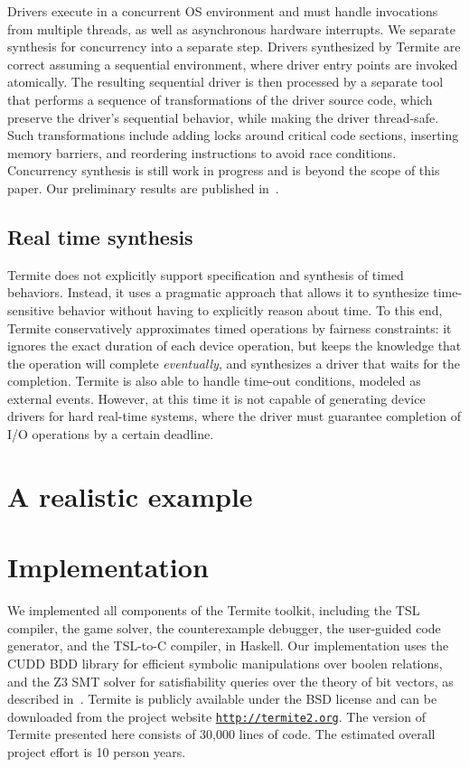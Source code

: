 \documentclass[a4paper,twoside,openright,11pt]{book}
\newcommand{\termite}{Termite\xspace}
\theoremstyle{definition}
\begin{document}
Drivers execute in a concurrent OS environment and must handle invocations from multiple threads, as well as asynchronous hardware interrupts.  We separate synthesis for concurrency into a separate step.  Drivers synthesized by \termite are correct assuming a sequential environment, where driver entry points are invoked atomically.  The resulting sequential driver is then processed by a separate tool that performs a sequence of transformations of the driver source code, which preserve the driver's sequential behavior, while making the driver thread-safe.  Such transformations include adding locks around critical code sections, inserting memory barriers, and reordering instructions to avoid race conditions.  Concurrency synthesis is still work in progress and is beyond the scope of this paper.  Our preliminary results are published in~\cite{Cerny_HRRT_13, Cerny_HRRT_14}.

\subsection{Real time synthesis}

\termite does not explicitly support specification and synthesis of timed behaviors.  Instead, it uses a pragmatic approach that allows it to synthesize time-sensitive behavior without having to explicitly reason about time.  To this end, \termite conservatively approximates timed operations by fairness constraints: it ignores the exact duration of each device operation, but keeps the knowledge that the operation will complete \emph{eventually}, and synthesizes a driver that waits for the completion.  \termite is also able to handle time-out conditions, modeled as external events.  However, at this time it is not capable of generating device drivers for hard real-time systems, where the driver must guarantee completion of I/O operations by a certain deadline.

\section{A realistic example}

\section{Implementation}

We implemented all components of the Termite toolkit, including the TSL compiler, the game solver, the counterexample debugger, the user-guided code generator, and the TSL-to-C compiler, in Haskell.  Our implementation uses the CUDD BDD library for efficient symbolic manipulations over boolen relations, and the Z3 SMT solver for satisfiability queries over the theory of bit vectors, as described in~\cite{Walker_Ryzhyk_14}.  Termite is publicly available under the BSD license and can be downloaded from the project website \texttt{\url{http://termite2.org}}. The version of \termite presented here consists of 30,000 lines of code.  The estimated overall project effort is 10 person years. 
\end{document}

